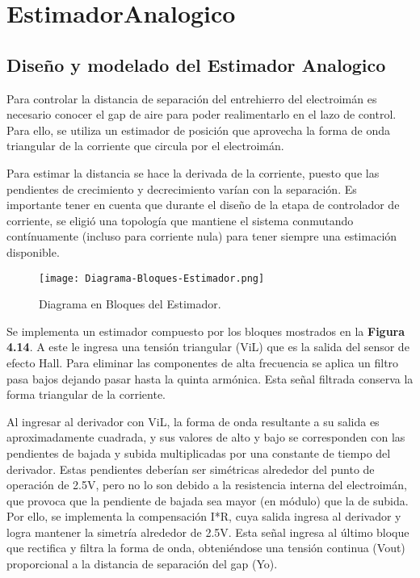 \chapter{EstimadorAnalogico}  \label{cap:Estimador Analogico}

\section{Diseño y modelado del Estimador Analogico}

Para controlar la distancia de separaci\'{o}n del entrehierro del electroim\'{a}n es necesario conocer el gap de aire para poder realimentarlo en el lazo de control.  Para ello, se utiliza un estimador de posici\'{o}n que aprovecha la forma de onda triangular de la corriente que circula por el electroim\'{a}n. 



\noindent Para estimar la distancia se hace la derivada de la corriente, puesto que las pendientes de crecimiento y decrecimiento var\'{i}an con la separaci\'{o}n. Es importante tener en cuenta que durante el dise\~{n}o de la etapa de controlador de corriente, se eligi\'{o} una topolog\'{i}a que mantiene el sistema conmutando cont\'{i}nuamente (incluso para corriente nula) para tener siempre una estimaci\'{o}n disponible.

\begin{figure}[H]
	\centering
	\texttt{[image: Diagrama-Bloques-Estimador.png]}
	\caption{Diagrama en Bloques del Estimador.}
	\label{fig:img_Diagrama-Bloques-Estimador.png}
\end{figure}

\noindent Se implementa un estimador compuesto por los bloques mostrados en la \textbf{Figura 4.14}. A este le ingresa una tensi\'{o}n triangular (ViL) que es la salida del sensor de efecto Hall. Para eliminar las componentes de alta frecuencia se aplica un filtro pasa bajos dejando pasar hasta la quinta arm\'{o}nica. Esta se\~{n}al filtrada conserva la forma triangular de la corriente. 



\noindent Al ingresar al derivador con ViL, la forma de onda resultante a su salida es aproximadamente cuadrada, y sus valores de alto y bajo se corresponden con las pendientes de bajada y subida multiplicadas por una constante de tiempo del derivador. Estas pendientes deber\'{i}an ser sim\'{e}tricas alrededor del punto de operaci\'{o}n de 2.5V, pero no lo son debido a la resistencia interna del electroim\'{a}n, que provoca que la pendiente de bajada sea mayor (en m\'{o}dulo) que la de subida. Por ello, se implementa la compensaci\'{o}n I*R, cuya salida ingresa al derivador y logra mantener la simetr\'{i}a alrededor de 2.5V. Esta se\~{n}al ingresa al \'{u}ltimo bloque que rectifica y filtra la forma de onda, obteni\'{e}ndose una tensi\'{o}n continua (Vout) proporcional a la distancia de separaci\'{o}n del gap (Yo).


